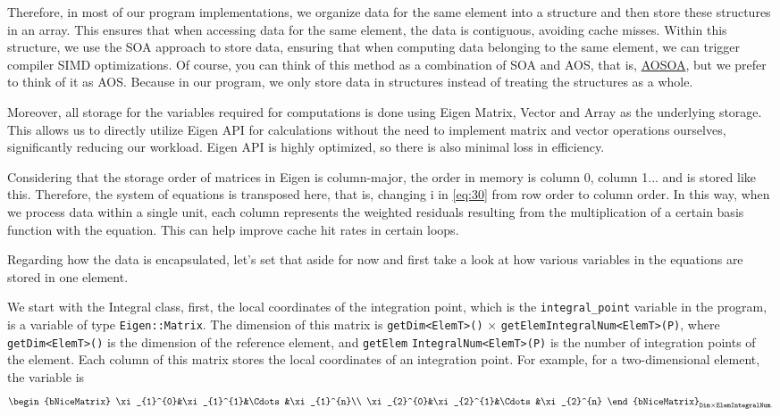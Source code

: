 \documentclass{develop-note}
\begin{document}
Therefore, in most of our program implementations, we organize data for the same element into a structure and then store these structures in an array. This ensures that when accessing data for the same element, the data is contiguous, avoiding cache misses. Within this structure, we use the SOA approach to store data, ensuring that when computing data belonging to the same element, we can trigger compiler SIMD optimizations. Of course, you can think of this method as a combination of SOA and AOS, that is, \href{https://en.wikipedia.org/wiki/AoS_and_SoA}{AOSOA}, but we prefer to think of it as AOS. Because in our program, we only store data in structures instead of treating the structures as a whole.

Moreover, all storage for the variables required for computations is done using Eigen Matrix, Vector and Array as the underlying storage. This allows us to directly utilize Eigen API for calculations without the need to implement matrix and vector operations ourselves, significantly reducing our workload. Eigen API is highly optimized, so there is also minimal loss in efficiency.

Considering that the storage order of matrices in Eigen is column-major, the order in memory is column 0, column 1... and is stored like this. Therefore, the system of equations is transposed here, that is, changing i in \autoref{eq:30} from row order to column order. In this way, when we process data within a single unit, each column represents the weighted residuals resulting from the multiplication of a certain basis function with the equation. This can help improve cache hit rates in certain loops.

Regarding how the data is encapsulated, let's set that aside for now and first take a look at how various variables in the equations are stored in one element.

We start with the Integral class, first, the local coordinates of the integration point, which is the \texttt{integral\_point} variable in the program, is a variable of type \texttt{Eigen::Matrix}. The dimension of this matrix is \texttt{getDim<ElemT>()} $\times$ \texttt{getElemIntegralNum<ElemT>(P)}, where \texttt{getDim<ElemT>()} is the dimension of the reference element, and \texttt{getElem} \texttt{IntegralNum<ElemT>(P)} is the number of integration points of the element. Each column of this matrix stores the local coordinates of an integration point. For example, for a two-dimensional element, the variable is
\begin{equation}
  \begin{bNiceMatrix}
    \xi_{1}^{0}&\xi_{1}^{1}&\Cdots&\xi_{1}^{n}\\
    \xi_{2}^{0}&\xi_{2}^{1}&\Cdots&\xi_{2}^{n}
  \end{bNiceMatrix}_{\texttt{Dim}\times\texttt{ElemIntegralNum}.}
\end{equation}
\end{document}
